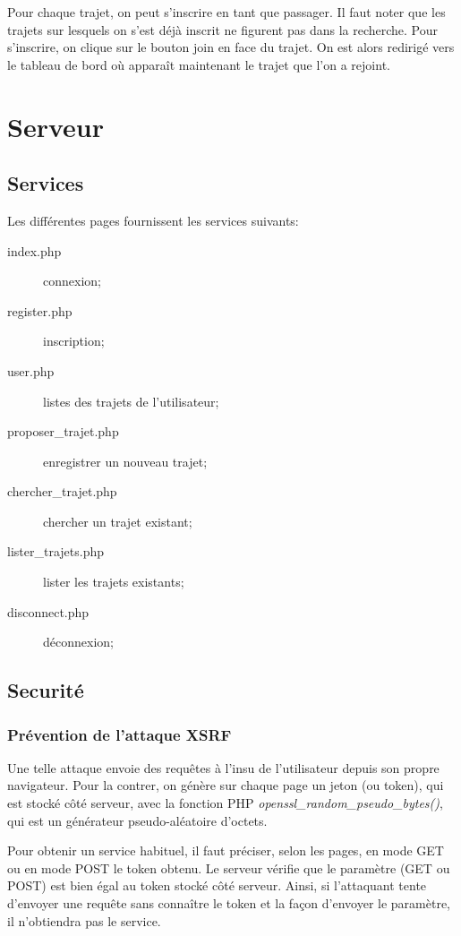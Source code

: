 \documentclass[a4paper]{article}
\begin{document}
Pour chaque trajet, on peut s'inscrire en tant que passager. Il faut
noter que les trajets sur lesquels on s'est déjà inscrit ne figurent
pas dans la recherche. Pour s'inscrire, on clique sur le bouton \og join \fg
en face du trajet. On est alors redirigé vers le tableau de bord où apparaît
maintenant le trajet que l'on a rejoint.

\section{Serveur}
\subsection{Services}

Les différentes pages fournissent les services suivants:
\begin{description}
	\item[index.php] connexion;
	\item[register.php] inscription;
	\item[user.php] listes des trajets de l'utilisateur;
	\item[proposer\_trajet.php] enregistrer un nouveau trajet;
	\item[chercher\_trajet.php] chercher un trajet existant;
	\item[lister\_trajets.php] lister les trajets existants;
	\item[disconnect.php] déconnexion;
\end{description}

\subsection{Securité}
\subsubsection{Prévention de l'attaque XSRF}
 		
Une telle attaque envoie des requêtes à l'insu de l'utilisateur
depuis son propre navigateur. Pour la contrer, on génère sur
chaque page un jeton (ou token), qui est stocké côté serveur,
avec la fonction PHP  \textit{openssl\_random\_pseudo\_bytes()},
qui est un générateur pseudo-aléatoire d'octets.

Pour obtenir un service habituel, il faut préciser, selon les pages, en mode GET
ou en mode POST le token obtenu. Le serveur vérifie que le paramètre
(GET ou POST) est bien égal au token stocké côté serveur.
Ainsi, si l'attaquant tente d'envoyer une requête sans connaître le
token et la façon d'envoyer le paramètre, il n'obtiendra pas le service.
\end{document}
